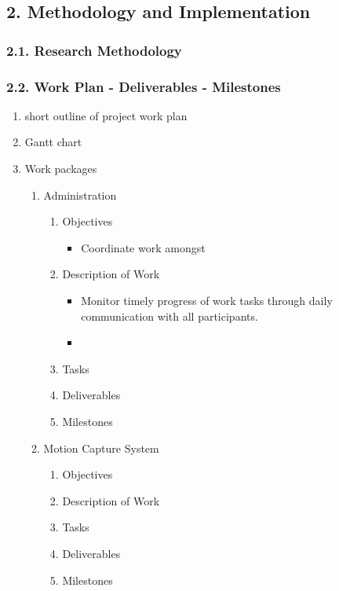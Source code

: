 \subsection{2. Methodology and Implementation}
\label{sec:orgd17d78c}
\subsubsection{2.1. Research Methodology}
\label{sec:org8bd07ac}
\subsubsection{2.2. Work Plan - Deliverables - Milestones}
\label{sec:orgdb17e82}
\begin{enumerate}
\item short outline of project work plan
\label{sec:org899b81c}
\item Gantt chart
\label{sec:orga3d569d}
\item Work packages
\label{sec:org7f771c4}
\begin{enumerate}
\item Administration
\label{sec:org884a6dc}
\begin{enumerate}
\item Objectives
\label{sec:org2f0b72f}
\begin{itemize}
\item Coordinate work amongst
\end{itemize}

\item Description of Work
\label{sec:orgb6bc8a2}
\begin{itemize}
\item Monitor timely progress of work tasks through daily communication with all participants.
\item 
\end{itemize}

\item Tasks
\label{sec:orgc128c22}
\item Deliverables
\label{sec:orgce0ac12}
\item Milestones
\label{sec:org06bcdeb}
\end{enumerate}


\item Motion Capture System
\label{sec:org16dc2c2}
\begin{enumerate}
\item Objectives
\label{sec:org926dcf8}
\item Description of Work
\label{sec:org500e265}
\item Tasks
\label{sec:orge75749a}
\item Deliverables
\label{sec:org06507fb}
\item Milestones
\label{sec:org625dbbe}
\end{enumerate}



\end{enumerate}
\end{enumerate}
